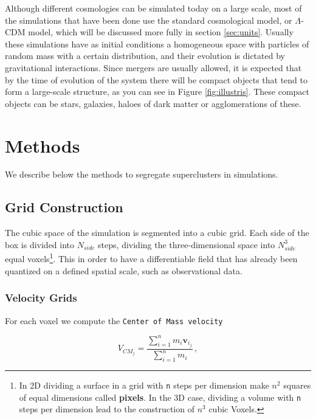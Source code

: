 \documentclass[a4paper,fleqn,usenatbib]{mnras}
\begin{document}
Although different cosmologies can be simulated today on a large scale, most of the simulations that have been done use the standard cosmological model, or $\Lambda$-CDM model, which will be discussed more fully in section \ref{sec:units}.
Usually these simulations have as initial conditions a homogeneous space with particles of random mass with a certain distribution, and their evolution is dictated by gravitational interactions. Since mergers are usually allowed, it is expected that by the time of evolution of the system there will be compact objects that tend to form a large-scale structure, as you can see in Figure \ref{fig:illustris}. These compact objects can be stars, galaxies, haloes of dark matter or agglomerations of these.




\section{Methods}

We describe below the methods to segregate superclusters in simulations.

\subsection{Grid Construction}


The cubic space of the simulation is segmented into a cubic grid. Each side of the box is divided into $N_{side}$ steps, dividing the three-dimensional space into $N_{side}^3$ equal voxels\footnote{In 2D dividing a surface in a grid with \texttt{n} steps  per dimension make $n^2$ squares of equal dimensions called \textbf{pixels}. In the 3D case, dividing a volume with \texttt{n} steps per dimension lead to the construction  of $n^3$ cubic Voxels. }. This in order to have a differentiable field that has already been quantized on a defined spatial scale, such as observational data.
 
\subsubsection{Velocity Grids}
\label{sec:INTROVgrid}
For each voxel we compute the \texttt{Center of Mass velocity}  

\begin{equation}
V_{CM_j}=\frac{\sum\limits_{i=1}^n m_i \textbf{v}_{i_j}}{\sum\limits_{i=1}^n m_i} \,,
\label{eq:CMcalc}
\end{equation}
\end{document}
